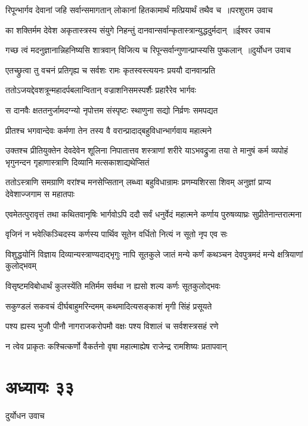 \threelineshloka
{रिपून्भार्गव देवानां जहि सर्वान्समागतान्}
{लोकानां हितकामार्थं मत्प्रियार्थं तथैव च ॥परशुराम उवाच}
{}


\threelineshloka
{का शक्तिर्मम देवेश अकृतास्त्रस्य संयुगे}
{निहन्तुं दानवान्सर्वान्कृतास्त्रान्युद्धदुर्मदान् ॥ईश्वर उवाच}
{}


\threelineshloka
{गच्छ त्वं मदनुज्ञानान्निहनिष्यसि शात्रवान्}
{विजित्य च रिपून्सर्वान्गुणान्प्राप्स्यसि पुष्कलान् ॥दुर्योधन उवाच}
{}


\twolineshloka
{एतच्छ्रुत्वा तु वचनं प्रतिगृह्य च सर्वशः}
{रामः कृतस्वस्त्ययनः प्रययौ दानवान्प्रति}


\twolineshloka
{ततोऽजयद्देवशत्रून्महादर्पबलान्वितान्}
{वज्राशनिसमस्पर्शैः प्रहारैरेव भार्गवः}


\twolineshloka
{स दानवैः क्षततनुर्जामदग्न्यो नृपोत्तम}
{संस्पृष्टः स्थाणुना सद्यो निर्व्रणः समपद्यत}


\twolineshloka
{प्रीतश्च भगवान्देवः कर्मणा तेन तस्य वै}
{वरान्प्रादाद्बहुविधान्भार्गवाय महात्मने}


उक्तश्च प्रीतियुक्तेन देवदेवेन शूलिना
\threelineshloka
{निपातात्तव शस्त्राणां शरीरे याऽभवद्रुजा}
{तया ते मानुषं कर्म व्यपोहं भृगुनन्दन}
{गृहाणास्त्राणि दिव्यानि मत्सकाशाद्यथेप्सितं}


\threelineshloka
{ततोऽस्त्राणि समग्राणि वरांश्च मनसेप्सितान्}
{लब्ध्वा बहुविधान्रामः प्रणम्यशिरसा शिवम्}
{अनुज्ञां प्राप्य देवेशाज्जगाम स महातपाः}


एवमेतत्पुरावृत्तं तथा कथितवानृषिः
\twolineshloka
{भार्गवोऽपि ददौ सर्वं धनुर्वेदं महात्मने}
{कर्णाय पुरुषव्याघ्रः सुप्रीतेनान्तरात्मना}


\twolineshloka
{वृजिनं न भवेत्किञ्चिदस्य कर्णस्य पार्थिव}
{सूतेन वर्धितो नित्यं न सूतो नृप एव सः}


\threelineshloka
{विशुद्धयोनिं विज्ञाय दिव्यान्यस्त्राण्यदाद्भृगुः}
{नापि सूतकुले जातं मन्ये कर्णं कथञ्चन}
{देवपुत्रमदं मन्ये क्षत्रियाणां कुलोद्भवम्}


\twolineshloka
{विसृष्टमविबोधार्थं कुलस्येंति मतिर्मम}
{सर्वथा न ह्यसो शल्य कर्णः सूतकुलोद्भवः}


\twolineshloka
{सकुण्डलं सकवचं दीर्घबाहुमरिन्दमम्}
{कथमादित्यसङ्काशं मृगी सिंहं प्रसूयते}


\twolineshloka
{पश्य ह्यस्य भुजौ पीनौ नागराजकरोपमौ}
{वक्षः पश्य विशालं च सर्वशस्त्रसहं रणे}


\twolineshloka
{न त्वेव प्राकृतः कश्चित्कर्णो वैकर्तनो वृषा}
{महात्माह्येष राजेन्द्र रामशिष्यः प्रतापवान्}


\chapter{अध्यायः ३३}
\twolineshloka
{दुर्योधन उवाच}
{}


